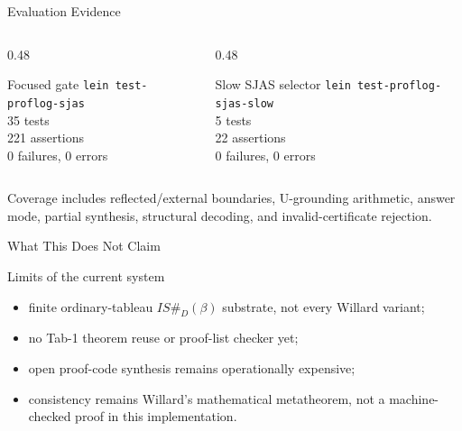 \documentclass[aspectratio=169]{beamer}
\newcommand{\code}[1]{\texttt{#1}}
\newcommand{\isdbeta}{\(IS\#_D(\beta)\)}
\begin{document}
\begin{frame}{Evaluation Evidence}
  \begin{columns}[T,onlytextwidth]
    \begin{column}{0.48\textwidth}
      \begin{block}{Focused gate}
        \code{lein test-proflog-sjas}\\
        \vspace{0.3em}
        35 tests\\
        221 assertions\\
        0 failures, 0 errors
      \end{block}
    \end{column}
    \begin{column}{0.48\textwidth}
      \begin{block}{Slow SJAS selector}
        \code{lein test-proflog-sjas-slow}\\
        \vspace{0.3em}
        5 tests\\
        22 assertions\\
        0 failures, 0 errors
      \end{block}
    \end{column}
  \end{columns}

  \vspace{0.8em}
  Coverage includes reflected/external boundaries, U-grounding arithmetic,
  answer mode, partial synthesis, structural decoding, and invalid-certificate
  rejection.
\end{frame}

\begin{frame}{What This Does Not Claim}
  \begin{alertblock}{Limits of the current system}
    \begin{itemize}
      \item finite ordinary-tableau \isdbeta{} substrate, not every Willard
            variant;
      \item no Tab-1 theorem reuse or proof-list checker yet;
      \item open proof-code synthesis remains operationally expensive;
      \item consistency remains Willard's mathematical metatheorem, not a
            machine-checked proof in this implementation.
    \end{itemize}
  \end{alertblock}
\end{frame}
\end{document}
